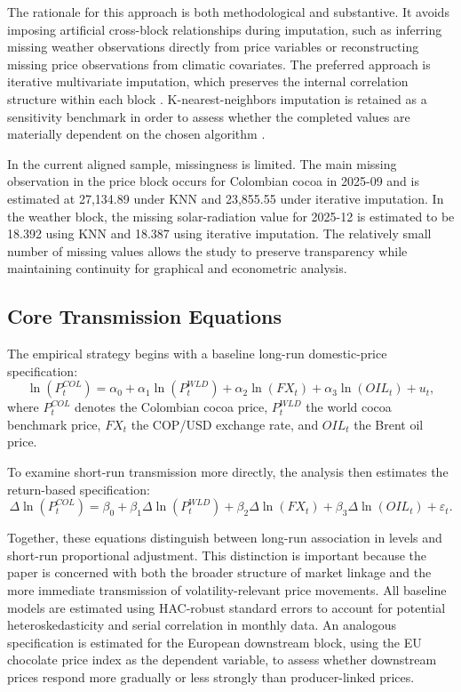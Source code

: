 \documentclass[11pt]{article}
\begin{document}
The rationale for this approach is both methodological and substantive. It avoids imposing artificial cross-block relationships during imputation, such as inferring missing weather observations directly from price variables or reconstructing missing price observations from climatic covariates. The preferred approach is iterative multivariate imputation, which preserves the internal correlation structure within each block \citep{vanbuuren_groothuisoudshoorn_2011}. K-nearest-neighbors imputation is retained as a sensitivity benchmark in order to assess whether the completed values are materially dependent on the chosen algorithm \citep{troyanskaya_etal_2001}.

In the current aligned sample, missingness is limited. The main missing observation in the price block occurs for Colombian cocoa in 2025-09 and is estimated at 27{,}134.89 under KNN and 23{,}855.55 under iterative imputation. In the weather block, the missing solar-radiation value for 2025-12 is estimated to be 18.392 using KNN and 18.387 using iterative imputation. The relatively small number of missing values allows the study to preserve transparency while maintaining continuity for graphical and econometric analysis.

\subsection{Core Transmission Equations}

The empirical strategy begins with a baseline long-run domestic-price specification:
\begin{equation}
\ln(P^{COL}_{t}) = \alpha_0 + \alpha_1 \ln(P^{WLD}_{t}) + \alpha_2 \ln(FX_t) + \alpha_3 \ln(OIL_t) + u_t,
\label{eq:core_levels}
\end{equation}
where $P^{COL}_{t}$ denotes the Colombian cocoa price, $P^{WLD}_{t}$ the world cocoa benchmark price, $FX_t$ the COP/USD exchange rate, and $OIL_t$ the Brent oil price.

To examine short-run transmission more directly, the analysis then estimates the return-based specification:
\begin{equation}
\Delta \ln(P^{COL}_{t}) = \beta_0 + \beta_1 \Delta \ln(P^{WLD}_{t}) + \beta_2 \Delta \ln(FX_t) + \beta_3 \Delta \ln(OIL_t) + \varepsilon_t.
\label{eq:core_returns}
\end{equation}

Together, these equations distinguish between long-run association in levels and short-run proportional adjustment. This distinction is important because the paper is concerned with both the broader structure of market linkage and the more immediate transmission of volatility-relevant price movements. All baseline models are estimated using HAC-robust standard errors to account for potential heteroskedasticity and serial correlation in monthly data. An analogous specification is estimated for the European downstream block, using the EU chocolate price index as the dependent variable, to assess whether downstream prices respond more gradually or less strongly than producer-linked prices.
\end{document}
